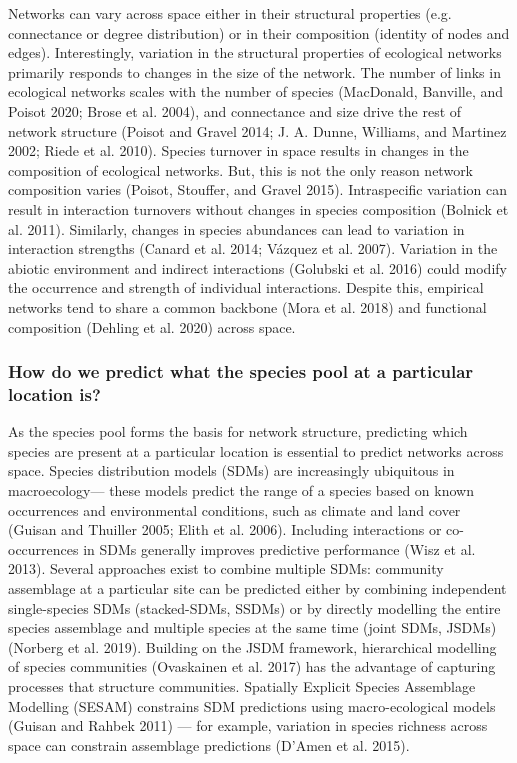 \documentclass[11pt]{article}
\begin{document}
Networks can vary across space either in their structural properties
(e.g. connectance or degree distribution) or in their composition
(identity of nodes and edges). Interestingly, variation in the
structural properties of ecological networks primarily responds to
changes in the size of the network. The number of links in ecological
networks scales with the number of species (MacDonald, Banville, and
Poisot 2020; Brose et al. 2004), and connectance and size drive the rest
of network structure (Poisot and Gravel 2014; J. A. Dunne, Williams, and
Martinez 2002; Riede et al. 2010). Species turnover in space results in
changes in the composition of ecological networks. But, this is not the
only reason network composition varies (Poisot, Stouffer, and Gravel
2015). Intraspecific variation can result in interaction turnovers
without changes in species composition (Bolnick et al. 2011). Similarly,
changes in species abundances can lead to variation in interaction
strengths (Canard et al. 2014; Vázquez et al. 2007). Variation in the
abiotic environment and indirect interactions (Golubski et al. 2016)
could modify the occurrence and strength of individual interactions.
Despite this, empirical networks tend to share a common backbone (Mora
et al. 2018) and functional composition (Dehling et al. 2020) across
space.

\hypertarget{how-do-we-predict-what-the-species-pool-at-a-particular-location-is}{%
\subsubsection{How do we predict what the species pool at a particular
location
is?}\label{how-do-we-predict-what-the-species-pool-at-a-particular-location-is}}

As the species pool forms the basis for network structure, predicting
which species are present at a particular location is essential to
predict networks across space. Species distribution models (SDMs) are
increasingly ubiquitous in macroecology--- these models predict the
range of a species based on known occurrences and environmental
conditions, such as climate and land cover (Guisan and Thuiller 2005;
Elith et al. 2006). Including interactions or co-occurrences in SDMs
generally improves predictive performance (Wisz et al. 2013). Several
approaches exist to combine multiple SDMs: community assemblage at a
particular site can be predicted either by combining independent
single-species SDMs (stacked-SDMs, SSDMs) or by directly modelling the
entire species assemblage and multiple species at the same time (joint
SDMs, JSDMs) (Norberg et al. 2019). Building on the JSDM framework,
hierarchical modelling of species communities (Ovaskainen et al. 2017)
has the advantage of capturing processes that structure communities.
Spatially Explicit Species Assemblage Modelling (SESAM) constrains SDM
predictions using macro-ecological models (Guisan and Rahbek 2011) ---
for example, variation in species richness across space can constrain
assemblage predictions (D'Amen et al. 2015).
\end{document}
